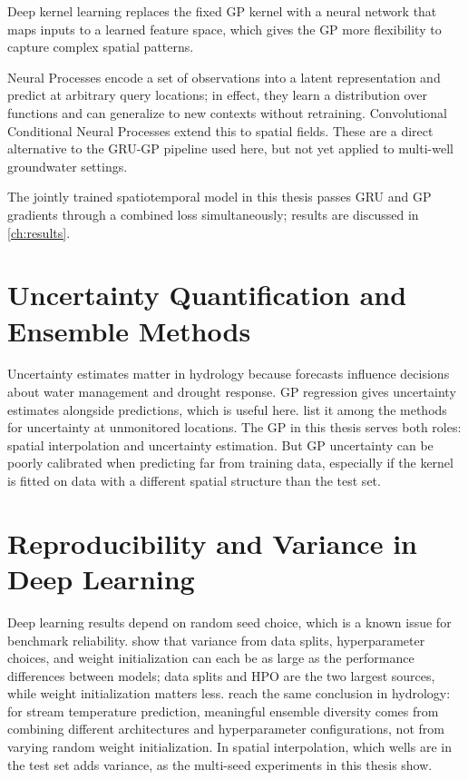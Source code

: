 Deep kernel learning \citep{wilson2016deep} replaces the fixed GP kernel with a neural network that maps inputs to a learned feature space, which gives the GP more flexibility to capture complex spatial patterns.

Neural Processes \citep{garnelo2018neural, dubois2020npf} encode a set of observations into a latent representation and predict at arbitrary query locations; in effect, they learn a distribution over functions and can generalize to new contexts without retraining. Convolutional Conditional Neural Processes \citep{gordon2020convolutional} extend this to spatial fields. These are a direct alternative to the GRU-GP pipeline used here, but not yet applied to multi-well groundwater settings.

The jointly trained spatiotemporal model in this thesis passes GRU and GP gradients through a combined loss simultaneously; results are discussed in \cref{ch:results}.

\section{Uncertainty Quantification and Ensemble Methods}
\label{sec:rw_uq}

Uncertainty estimates matter in hydrology because forecasts influence decisions about water management and drought response. GP regression gives uncertainty estimates alongside predictions, which is useful here. \citet{willard2023time} list it among the methods for uncertainty at unmonitored locations. The GP in this thesis serves both roles: spatial interpolation and uncertainty estimation. But GP uncertainty can be poorly calibrated when predicting far from training data, especially if the kernel is fitted on data with a different spatial structure than the test set.

\section{Reproducibility and Variance in Deep Learning}
\label{sec:rw_repro}

Deep learning results depend on random seed choice, which is a known issue for benchmark reliability. \citet{bouthillier2021accounting} show that variance from data splits, hyperparameter choices, and weight initialization can each be as large as the performance differences between models; data splits and HPO are the two largest sources, while weight initialization matters less. \citet{willard2025ensembles} reach the same conclusion in hydrology: for stream temperature prediction, meaningful ensemble diversity comes from combining different architectures and hyperparameter configurations, not from varying random weight initialization. In spatial interpolation, which wells are in the test set adds variance, as the multi-seed experiments in this thesis show.

